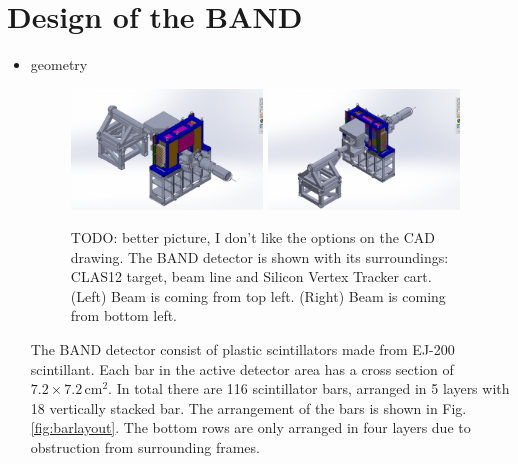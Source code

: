 \documentclass[review]{elsarticle}
\begin{document}
\section{Design of the BAND}

\begin{itemize}
\item geometry
\begin{figure}[thb]
\centering
\includegraphics[width=0.48\textwidth]{BandInContext1.png}
\includegraphics[width=0.48\textwidth]{BandInContext2.png}
 \caption{TODO: better picture, I don't like the options on the CAD drawing. The BAND detector is shown with its surroundings: CLAS12 target, beam line and Silicon Vertex Tracker cart. (Left) Beam is coming from top left. (Right) Beam is coming from bottom left. }
  \label{fig:bandcontext}
\end{figure}
The BAND detector consist of plastic scintillators made from  EJ-200 scintillant. Each bar in the active detector area has a cross section of $7.2 \times 7.2\,\mathrm{cm}^{2}$. In total there are 116 scintillator bars, arranged in 5 layers with 18 vertically stacked bar. The arrangement of the bars is shown in Fig. \ref{fig:barlayout}. The bottom rows are only arranged in four layers due to obstruction from surrounding frames.


\end{itemize}
\end{document}
